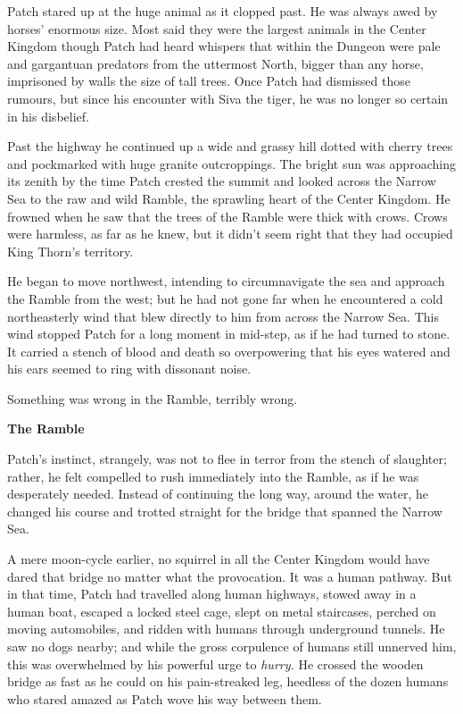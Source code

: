 \documentclass[11pt]{article}
\begin{document}
 Patch stared up at the huge animal as it clopped past. He was always awed by horses' enormous size. Most said they were the largest animals in the Center Kingdom %
 though Patch had heard whispers that within the Dungeon were pale and gargantuan predators from the uttermost North, bigger than any horse, imprisoned by walls the size of tall trees. Once Patch had dismissed those rumours, but since his encounter with Siva the tiger, he was no longer so certain in his disbelief.\par
 Past the highway he continued up a wide and grassy hill dotted with cherry trees and pockmarked with huge granite outcroppings. The bright sun was approaching its zenith by the time Patch crested the summit and looked across the Narrow Sea to the raw and wild Ramble, the sprawling heart of the Center Kingdom. He frowned when he saw that the trees of the Ramble were thick with crows. Crows were harmless, as far as he knew, but it didn't seem right that they had occupied King Thorn's territory. \par
 He began to move northwest, intending to circumnavigate the sea and approach the Ramble from the west; but he had not gone far when he encountered a cold northeasterly wind that blew directly to him from across the Narrow Sea. This wind stopped Patch for a long moment in mid-step, as if he had turned to stone. It carried a stench of blood and death so overpowering that his eyes watered and his ears seemed to ring with dissonant noise.\par
 Something was wrong in the Ramble, terribly wrong.\par
\par
{\bf The Ramble\par
}\par
 Patch's instinct, strangely, was not to flee in terror from the stench of slaughter; rather, he felt compelled to rush immediately into the Ramble, as if he was desperately needed. Instead of continuing the long way, around the water, he changed his course and trotted straight for the bridge that spanned the Narrow Sea.\par
 A mere moon-cycle earlier, no squirrel in all the Center Kingdom would have dared that bridge no matter what the provocation. It was a human pathway. But in that time, Patch had travelled along human highways, stowed away in a human boat, escaped a locked steel cage, slept on metal staircases, perched on moving automobiles, and ridden with humans through underground tunnels. He saw no dogs nearby; and while the gross corpulence of humans still unnerved him, this was overwhelmed by his powerful urge to {\it hurry.} He crossed the wooden bridge as fast as he could on his pain-streaked leg, heedless of the dozen humans who stared amazed as Patch wove his way between them.\par
\end{document}
